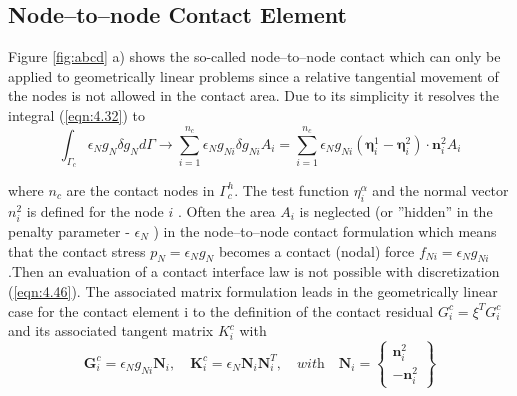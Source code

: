 \subsection{Node–to–node Contact Element}
Figure \ref{fig:abcd} a) shows the so-called node–to–node contact which can only be applied to geometrically linear problems since a relative tangential movement of the nodes is not allowed in
the contact area. Due to its simplicity it resolves the integral (\ref{eqn:4.32}) to
\begin{equation}
 \int_{\Gamma_{c}} \epsilon_{N} g_{N} \delta g_{N} d \Gamma \longrightarrow \sum_{i=1}^{n_{c}} \epsilon_{N} g_{N i} \delta g_{N i} A_{i}=\sum_{i=1}^{n_{c}} \epsilon_{N} g_{N i}\left(\boldsymbol{\eta}_{i}^{1}-\boldsymbol{\eta}_{i}^{2}\right) \cdot \mathbf{n}_{i}^{2} A_{i} 
 \label{eqn:4.46}
\end{equation}

where $n _c$ are the contact nodes in $\Gamma^h_c$. The test function $\eta_i^\alpha$ and the normal vector $n^ 2_ i$ is
deﬁned for the node $i$ . Often the area $A_ i$ is neglected
(or ”hidden” in the penalty parameter - $\epsilon_N$ ) in the node–to–node contact formulation which
means that the contact stress $p_N=\epsilon_N g_N$ becomes a contact (nodal) force $f_{Ni}=\epsilon_N g_{Ni}$ .Then an evaluation of a contact interface law is not possible with discretization
(\ref{eqn:4.46}). The associated matrix formulation leads in the geometrically linear case for the contact
element i to the deﬁnition of the contact residual $G ^c_i = \xi ^T G^ c_i $ and its associated tangent
matrix $K ^c_i $ with
\begin{equation}
 \mathbf{G}_{i}^{c}=\epsilon_{N} g_{N i} \mathbf{N}_{i}, \quad \mathbf{K}_{i}^{c}=\epsilon_{N} \mathbf{N}_{i} \mathbf{N}_{i}^{T}, \quad  \textit{with}  \quad \mathbf{N}_{i}=\left\{\begin{array}{r}\mathbf{n}_{i}^{2} \\ -\mathbf{n}_{i}^{2}\end{array}\right\} 
\end{equation}

